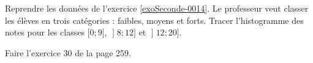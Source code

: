 
\begin{exercice}\label{exosmath-0535}

    Reprendre les données de l'exercice \ref{exoSeconde-0014}. Le professeur veut classer les élèves en trois catégories : faibles, moyens et forts. Tracer l'histogramme des notes pour les classes \( \mathopen[ 0 ;9 \mathclose]\), \( \mathopen] 8 ; 12 \mathclose]\) et \( \mathopen] 12;20 \mathclose]\).

    Faire l'exercice 30 de la page 259.

\end{exercice}
